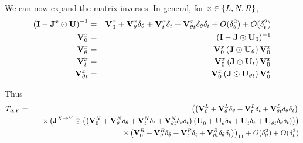 \documentclass{article}
\begin{document}
We can now expand the matrix inverses.
In general, for $x \in \{ L, N, R \}$,
\begin{eqnarray*}
  \left( {\bf I} - {\bf J}^x \odot {\bf U} \right)^{-1}
  & = & {\bf V}_0^{x} + {\bf V}_\theta^{x} \delta_\theta + {\bf V}_t^{x} \delta_t + {\bf V}_{\theta t}^{x} \delta_\theta \delta_t + O(\delta_\theta^2) + O(\delta_t^2) \\
{\bf V}^x_0 & = & ({\bf I} - {\bf J} \odot {\bf U}_0)^{-1} \\
{\bf V}^x_\theta & = & {\bf V}^x_0 \left( {\bf J} \odot {\bf U}_\theta \right) {\bf V}^x_0 \\
{\bf V}^x_t & = & {\bf V}^x_0 \left( {\bf J} \odot {\bf U}_t \right) {\bf V}^x_0 \\
{\bf V}^x_{\theta t} & = & {\bf V}^x_0 \left( {\bf J} \odot {\bf U}_{\theta t} \right) {\bf V}^x_0
\end{eqnarray*}

Thus
\begin{eqnarray*}
T_{XY} & = &
\left(
\left( {\bf V}_0^{L} + {\bf V}_\theta^{L} \delta_\theta + {\bf V}_t^{L} \delta_t + {\bf V}_{\theta t}^{L} \delta_\theta \delta_t \right)
\right. \\ & & \quad \times
\left(
     {\bf J}^{X \to Y} \odot
     \left( \left( {\bf V}_0^{N} + {\bf V}_\theta^{N} \delta_\theta + {\bf V}_t^{N} \delta_t + {\bf V}_{\theta t}^{N} \delta_\theta \delta_t \right)
     \left( {\bf U}_0^{} + {\bf U}_\theta^{} \delta_\theta + {\bf U}_t^{} \delta_t + {\bf U}_{\theta t}^{} \delta_\theta \delta_t \right) \right)
\right)
 \\ & & \quad \left. \times
 \left( {\bf V}_0^{R} + {\bf V}_\theta^{R} \delta_\theta + {\bf V}_t^{R} \delta_t + {\bf V}_{\theta t}^{R} \delta_\theta \delta_t \right)
\right)_{11}  + O(\delta_\theta^2) + O(\delta_t^2)
\end{eqnarray*}
\end{document}
